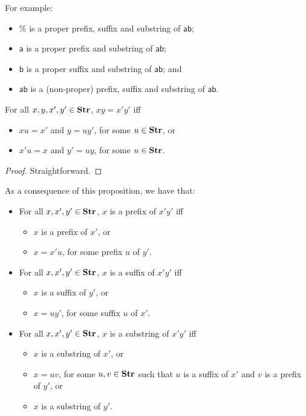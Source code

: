 For example:
\begin{itemize}
\item $\%$ is a proper prefix, suffix and substring of
$\mathsf{ab}$;

\item $\mathsf{a}$ is a proper prefix and substring of
$\mathsf{ab}$;

\item $\mathsf{b}$ is a proper suffix and substring of
$\mathsf{ab}$; and

\item $\mathsf{ab}$ is a (non-proper) prefix, suffix and
substring of $\mathsf{ab}$.
\end{itemize}

\begin{proposition}
For all $x,y,x',y'\in\mathbf{Str}$, $xy=x'y'$ iff
\begin{itemize}
\item $xu=x'$ and $y=uy'$, for some $u\in\mathbf{Str}$, or

\item $x'u=x$ and $y'=uy$, for some $u\in\mathbf{Str}$.
\end{itemize}
\end{proposition}

\begin{proof}
Straightforward.
\end{proof}

As a consequence of this proposition, we have that:
\begin{itemize}
\item For all $x,x',y'\in\mathbf{Str}$, $x$ is a prefix of $x'y'$ iff
\begin{itemize}
\item $x$ is a prefix of $x'$, or

\item $x=x'u$, for some prefix $u$ of $y'$.
\end{itemize}

\item For all $x,x',y'\in\mathbf{Str}$, $x$ is a suffix of $x'y'$ iff
\begin{itemize}
\item $x$ is a suffix of $y'$, or

\item $x=uy'$, for some suffix $u$ of $x'$.
\end{itemize}

\item For all $x,x',y'\in\mathbf{Str}$, $x$ is a substring of $x'y'$ iff
\begin{itemize}
\item $x$ is a substring of $x'$, or

\item $x=uv$, for some $u,v\in\mathbf{Str}$ such that
  $u$ is a suffix of $x'$ and $v$ is a prefix of $y'$, or

\item $x$ is a substring of $y'$.
\end{itemize}
\end{itemize}

